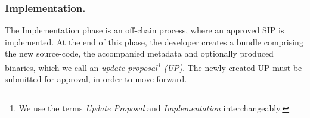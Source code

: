 

\subsubsection{Implementation.}

The Implementation phase is an off-chain process, where an approved SIP is 
implemented. 
At the end of this phase, the developer creates a bundle comprising the new 
source-code, the accompanied metadata and optionally produced binaries, which 
we call an \emph{update proposal\footnote{We use the terms \emph{Update 
Proposal} and \emph{Implementation} interchangeably.} (UP)}. The newly created 
UP must be submitted for approval, in order to move forward.

